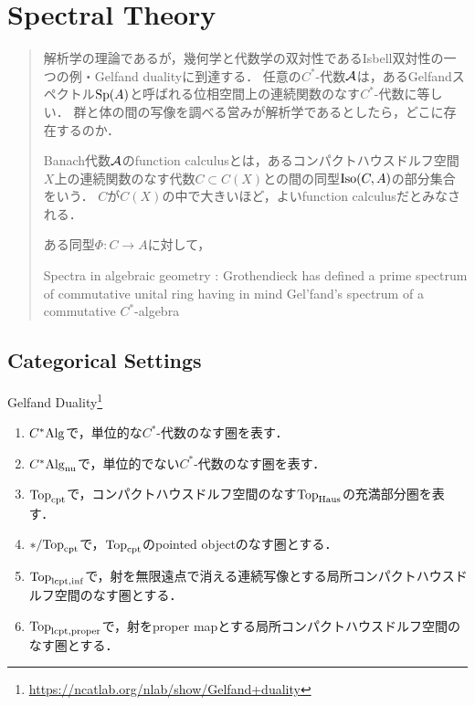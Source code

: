 \documentclass[uplatex,dvipdfmx]{jsreport}
\begin{document}
\chapter{Spectral Theory}

\begin{quotation}
    解析学の理論であるが，幾何学と代数学の双対性であるIsbell双対性の一つの例・Gelfand dualityに到達する．
    任意の$C^*$-代数$\mathcal{A}$は，あるGelfandスペクトル$\mathrm{Sp}(A)$と呼ばれる位相空間上の連続関数のなす$C^*$-代数に等しい．
    群と体の間の写像を調べる営みが解析学であるとしたら，どこに存在するのか．

    Banach代数$\mathcal{A}$のfunction calculusとは，あるコンパクトハウスドルフ空間$X$上の連続関数のなす代数$C\subset C(X)$との間の同型$\mathrm{Iso}(C,A)$の部分集合をいう．
    $C$が$C(X)$の中で大きいほど，よいfunction calculusだとみなされる．

    ある同型$\Phi:C\to A$に対して，

    Spectra in algebraic geometry : 
    Grothendieck has defined a prime spectrum of commutative unital ring having in mind Gel'fand's spectrum of a commutative $C^*$-algebra
\end{quotation}

\section{Categorical Settings}

\begin{tcolorbox}[colframe=ForestGreen, colback=ForestGreen!10!white,breakable,colbacktitle=ForestGreen!40!white,coltitle=black,fonttitle=\bfseries\sffamily,
title=]
    Gelfand Duality\footnote{\url{https://ncatlab.org/nlab/show/Gelfand+duality}}
\end{tcolorbox}

\begin{notation}\mbox{}
    \begin{enumerate}
        \item $C^*\mathrm{Alg}$で，単位的な$C^*$-代数のなす圏を表す．
        \item $C^*\mathrm{Alg}_{\mathrm{nu}}$で，単位的でない$C^*$-代数のなす圏を表す．
        \item $\mathrm{Top}_{\mathrm{cpt}}$で，コンパクトハウスドルフ空間のなす$\mathrm{Top}_{\mathrm{Haus}}$の充満部分圏を表す．
        \item $*/\mathrm{Top}_{\mathrm{cpt}}$で，$\mathrm{Top}_{\mathrm{cpt}}$のpointed objectのなす圏とする．
        \item $\mathrm{Top}_{\mathrm{lcpt},\mathrm{inf}}$で，射を無限遠点で消える連続写像とする局所コンパクトハウスドルフ空間のなす圏とする．
        \item $\mathrm{Top}_{\mathrm{lcpt},\mathrm{proper}}$で，射をproper mapとする局所コンパクトハウスドルフ空間のなす圏とする．
    \end{enumerate}
\end{notation}
\end{document}
